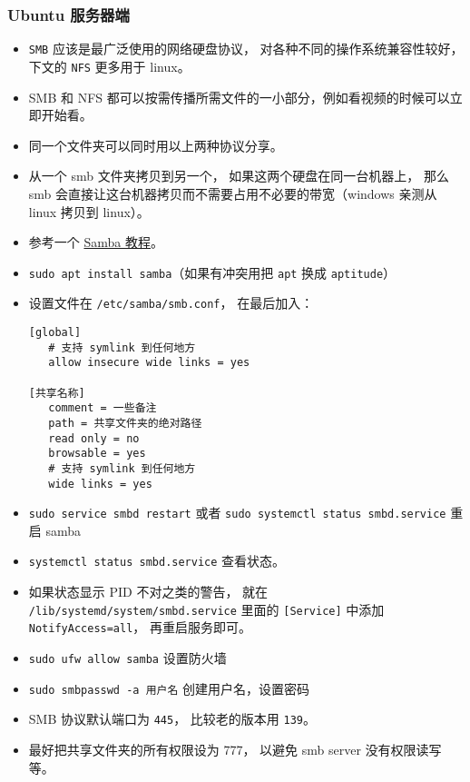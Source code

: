 \subsubsection{Ubuntu 服务器端}
\begin{itemize}
\item \verb|SMB| 应该是最广泛使用的网络硬盘协议， 对各种不同的操作系统兼容性较好， 下文的 \verb|NFS| 更多用于 linux。
\item SMB 和 NFS 都可以按需传播所需文件的一小部分，例如看视频的时候可以立即开始看。
\item 同一个文件夹可以同时用以上两种协议分享。
\item 从一个 smb 文件夹拷贝到另一个， 如果这两个硬盘在同一台机器上， 那么 smb 会直接让这台机器拷贝而不需要占用不必要的带宽（windows 亲测从 linux 拷贝到 linux）。
\item 参考一个 \href{https://ubuntu.com/tutorials/install-and-configure-samba}{Samba 教程}。
\item \verb|sudo apt install samba|（如果有冲突用把 \verb|apt| 换成 \verb|aptitude|）
\item 设置文件在 \verb|/etc/samba/smb.conf|， 在最后加入：
\begin{lstlisting}[language=none]
[global]
   # 支持 symlink 到任何地方
   allow insecure wide links = yes

[共享名称]
   comment = 一些备注
   path = 共享文件夹的绝对路径
   read only = no
   browsable = yes
   # 支持 symlink 到任何地方
   wide links = yes
\end{lstlisting}
\item \verb|sudo service smbd restart| 或者 \verb|sudo systemctl status smbd.service| 重启 samba
\item \verb|systemctl status smbd.service| 查看状态。
\item 如果状态显示 PID 不对之类的警告， 就在 \verb|/lib/systemd/system/smbd.service| 里面的 \verb|[Service]| 中添加 \verb|NotifyAccess=all|， 再重启服务即可。
\item \verb|sudo ufw allow samba| 设置防火墙
\item \verb|sudo smbpasswd -a 用户名| 创建用户名，设置密码
\item SMB 协议默认端口为 \verb|445|， 比较老的版本用 \verb|139|。
\item 最好把共享文件夹的所有权限设为 777， 以避免 smb server 没有权限读写等。
\end{itemize}

